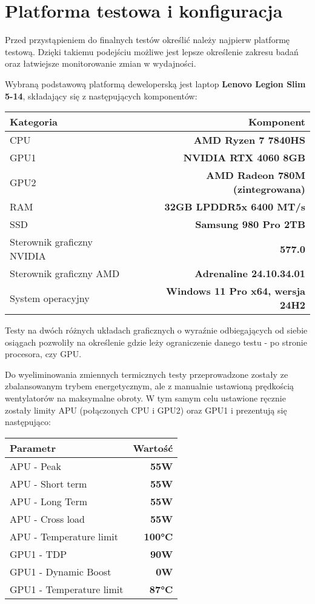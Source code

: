 \chapter{Platforma testowa i konfiguracja}

Przed przystąpieniem do finalnych testów określić należy najpierw
platformę testową. Dzięki takiemu podejściu możliwe jest lepsze określenie zakresu
badań oraz łatwiejsze monitorowanie zmian w wydajności.

Wybraną podstawową platformą deweloperską jest laptop \textbf{Lenovo Legion Slim 5-14}, składający się z następujących komponentów:

\begin{center}
	\begin{tabular}{ |l r| }
		\hline
		\textbf{Kategoria} & \textbf{Komponent} \\
		\hline
		CPU & \textbf{AMD Ryzen 7 7840HS} \\
		GPU1 & \textbf{NVIDIA RTX 4060 8GB} \\
		GPU2 & \textbf{AMD Radeon 780M (zintegrowana)} \\
		RAM & \textbf{32GB LPDDR5x 6400 MT/s} \\
		SSD & \textbf{Samsung 980 Pro 2TB} \\
		Sterownik graficzny NVIDIA & \textbf{577.0} \\
		Sterownik graficzny AMD & \textbf{Adrenaline 24.10.34.01} \\
		System operacyjny & \textbf{Windows 11 Pro x64, wersja 24H2} \\
		\hline
	\end{tabular}
\end{center}

Testy na dwóch różnych układach graficznych o wyraźnie odbiegających od siebie osiągach pozwoliły na określenie gdzie leży ograniczenie danego testu - po stronie procesora, czy GPU.

Do wyeliminowania zmiennych termicznych testy przeprowadzone zostały ze zbalansowanym trybem energetycznym, ale z manualnie ustawioną prędkością wentylatorów na maksymalne obroty. W tym samym celu ustawione ręcznie zostały limity APU (połączonych CPU i GPU2) oraz GPU1 i prezentują się następująco:

\begin{center}
	\begin{tabular}{ |l r| }
		\hline
		\textbf{Parametr} & \textbf{Wartość} \\
		\hline
		APU - Peak & \textbf{55W} \\
		APU - Short term & \textbf{55W} \\
		APU - Long Term & \textbf{55W} \\
		APU - Cross load & \textbf{55W} \\
		APU - Temperature limit & \textbf{100°C} \\
		GPU1 - TDP & \textbf{90W} \\
		GPU1 - Dynamic Boost & \textbf{0W} \\
		GPU1 - Temperature limit & \textbf{87°C} \\
		\hline
	\end{tabular}
\end{center}

